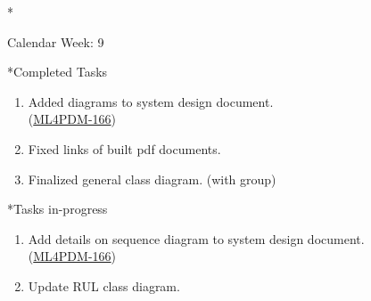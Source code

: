 \documentclass[11pt,a4paper]{article}
\begin{document}
\newpage
\begin{section}*{Calendar Week: 9 \hfill \date{5 March, 2021}}
 \begin{refsection}
   \begin{subsection}*{Completed Tasks}
     \begin{enumerate}
       \item
             Added diagrams to system design document.\\
             (\href{https://ml4pdm.atlassian.net/browse/ML4PDM-166}{ML4PDM-166})
       \item
             Fixed links of built pdf documents.
       \item
             Finalized general class diagram. (with group)
     \end{enumerate}
   \end{subsection}
   \begin{subsection}*{Tasks in-progress}
     \begin{enumerate}
       \item
             Add details on sequence diagram to system design document.\\
             (\href{https://ml4pdm.atlassian.net/browse/ML4PDM-166}{ML4PDM-166})
       \item
             Update RUL class diagram.
     \end{enumerate}
   \end{subsection}
 \end{refsection}
\end{section}
\end{document}
